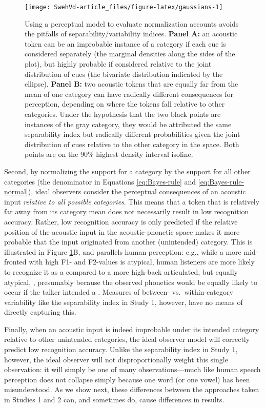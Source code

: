 \documentclass[utf8]{frontiersSCNS}
\begin{document}
\begin{figure}

{\centering \texttt{[image: SwehVd-article\_files/figure-latex/gaussians-1]} 

}

\caption{Using a perceptual model to evaluate normalization accounts avoids the pitfalls of separability/variability indices. \textbf{Panel A:} an acoustic token can be an improbable instance of a category if each cue is considered separately (the marginal densities along the sides of the plot), but highly probable if considered relative to the joint distribution of cues (the bivariate distribution indicated by the ellipse). \textbf{Panel B:} two acoustic tokens that are equally far from the mean of one category can have radically different consequences for perception, depending on where the tokens fall relative to other categories. Under the hypothesis that the two black points are instances of the gray category, they would be attributed the same separability index but radically different probabilities given the joint distribution of cues relative to the other category in the space. Both points are on the 90\% highest density interval isoline.}\label{fig:gaussians}
\end{figure}

Second, by normalizing the support for a category by the support for all other categories (the denominator in Equations \eqref{eq:Bayes-rule} and \eqref{eq:Bayes-rule-normal}), ideal observers consider the perceptual consequences of an acoustic input \emph{relative to all possible categories}. This means that a token that is relatively far away from its category mean does not necessarily result in low recognition accuracy. Rather, low recognition accuracy is only predicted if the relative position of the acoustic input in the acoustic-phonetic space makes it more probable that the input originated from another (unintended) category. This is illustrated in Figure \ref{fig:gaussians}B, and parallels human perception: e.g., while a more mid-fronted \ipatext{[ɑː]} with high F1- and F2-values is atypical, human listeners are more likely to recognize it as a \ipatext{[ɑː]} compared to a more high-back articulated, but equally atypical, \ipatext{[ɑː]}, presumably because the observed phonetics would be equally likely to occur if the talker intended a \ipatext{[oː]}. Measures of between- vs.~within-category variability like the separability index in Study 1, however, have no means of directly capturing this.

Finally, when an acoustic input is indeed improbable under its intended category relative to other unintended categories, the ideal observer model will correctly predict low recognition accuracy. Unlike the separability index in Study 1, however, the ideal observer will not disproportionally weight this single observation: it will simply be one of many observations---much like human speech perception does not collapse simply because one word (or one vowel) has been misunderstood. As we show next, these differences between the approaches taken in Studies 1 and 2 can, and sometimes do, cause differences in results.
\end{document}
